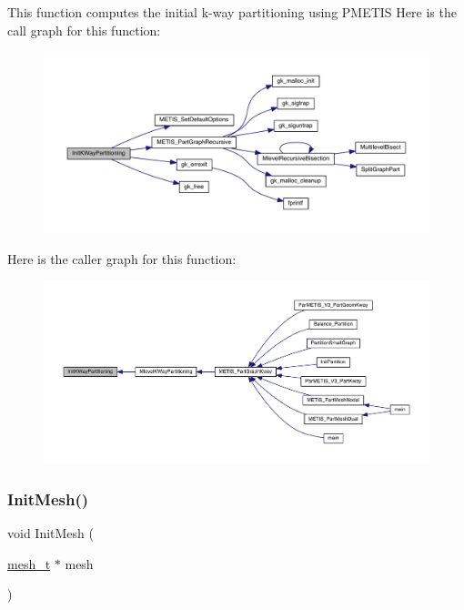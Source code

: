 This function computes the initial k-\/way partitioning using P\+M\+E\+T\+IS Here is the call graph for this function\+:\nopagebreak
\begin{figure}[H]
\begin{center}
\leavevmode
\includegraphics[width=350pt]{a00945_a870e37cc14eb1033c62d83d3a7c33a91_cgraph}
\end{center}
\end{figure}
Here is the caller graph for this function\+:\nopagebreak
\begin{figure}[H]
\begin{center}
\leavevmode
\includegraphics[width=350pt]{a00945_a870e37cc14eb1033c62d83d3a7c33a91_icgraph}
\end{center}
\end{figure}
\mbox{\label{a00945_a82cd62ea70eaae4395fee538d40cf12b}} 
\subsubsection{\texorpdfstring{Init\+Mesh()}{InitMesh()}}
{\footnotesize\ttfamily void Init\+Mesh (\begin{DoxyParamCaption}\item[{\hyperlink{a00738}{mesh\+\_\+t} $\ast$}]{mesh }\end{DoxyParamCaption})}

